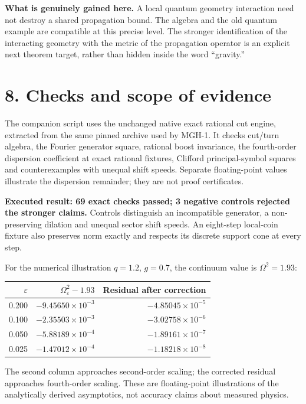 \documentclass[11pt,a4paper]{article}
\begin{document}
\textbf{What is genuinely gained here.} A local quantum geometry interaction need not destroy a shared propagation bound. The algebra and the old quantum example are compatible at this precise level. The stronger identification of the interacting geometry with the metric of the propagation operator is an explicit next theorem target, rather than hidden inside the word ``gravity.''

\newpage
\section*{8. Checks and scope of evidence}
The companion script uses the unchanged native exact rational cut engine, extracted from the same pinned archive used by MGH-1. It checks cut/turn algebra, the Fourier generator square, rational boost invariance, the fourth-order dispersion coefficient at exact rational fixtures, Clifford principal-symbol squares and counterexamples with unequal shift speeds. Separate floating-point values illustrate the dispersion remainder; they are not proof certificates.

\textbf{Executed result: 69 exact checks passed; 3 negative controls rejected the stronger claims.} Controls distinguish an incompatible generator, a non-preserving dilation and unequal sector shift speeds. An eight-step local-coin fixture also preserves norm exactly and respects its discrete support cone at every step.

For the numerical illustration $q=1.2$, $g=0.7$, the continuum value is $\Omega^2=1.93$:
\begin{center}
\begin{tabular}{rrr}
\toprule
$\varepsilon$ & $\Omega_\varepsilon^2-1.93$ & Residual after correction\\\midrule
0.200 & $-9.45650\times10^{-3}$ & $-4.85045\times10^{-5}$\\
0.100 & $-2.35503\times10^{-3}$ & $-3.02758\times10^{-6}$\\
0.050 & $-5.88189\times10^{-4}$ & $-1.89161\times10^{-7}$\\
0.025 & $-1.47012\times10^{-4}$ & $-1.18218\times10^{-8}$\\\bottomrule
\end{tabular}
\end{center}
The second column approaches second-order scaling; the corrected residual approaches fourth-order scaling. These are floating-point illustrations of the analytically derived asymptotics, not accuracy claims about measured physics.
\end{document}
